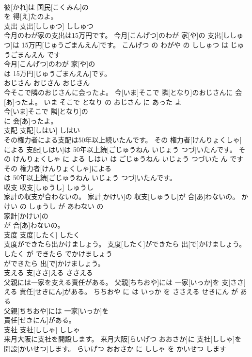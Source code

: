 \documentclass[8pt]{extreport}
\begin{document}
\begin{CJK}{UTF8}{min}
\\	彼[かれ]は 国民[こくみん]の
\\	を 得[え]たのよ。			
\\	支出	支出[ししゅつ]	ししゅつ	
\\	今月のわが家の支出は15万円です。	今月[こんげつ]のわが 家[や]の 支出[ししゅつ]は 15万円[じゅうごまんえん]です。	こんげつ の わがや の ししゅつ は じゅうごまんえん です	
\\	今月[こんげつ]のわが 家[や]の
\\	は 15万円[じゅうごまんえん]です。			
\\	おじさん	おじさん	おじさん	
\\	今そこで隣のおじさんに会ったよ。	今[いま]そこで 隣[となり]のおじさんに 会[あ]ったよ。	いま そこで となり の おじさん に あった よ	
\\	今[いま]そこで 隣[となり]の
\\	に 会[あ]ったよ。			
\\	支配	支配[しはい]	しはい	
\\	その権力者による支配は50年以上続いたんです。	その 権力者[けんりょくしゃ]による 支配[しはい]は 50年以上続[ごじゅうねん いじょう つづ]いたんです。	その けんりょくしゃ に よる しはい は ごじゅうねん いじょう つづいた ん です	
\\	その 権力者[けんりょくしゃ]による
\\	は 50年以上続[ごじゅうねん いじょう つづ]いたんです。			
\\	収支	収支[しゅうし]	しゅうし	
\\	家計の収支が合わないの。	家計[かけい]の 収支[しゅうし]が 合[あ]わないの。	かけい の しゅうし が あわない の	
\\	家計[かけい]の
\\	が 合[あ]わないの。			
\\	支度	支度[したく]	したく	
\\	支度ができたら出かけましょう。	支度[したく]ができたら 出[で]かけましょう。	したく が できたら でかけましょう	
\\	ができたら 出[で]かけましょう。			
\\	支える	支[ささ]える	ささえる	
\\	父親には一家を支える責任がある。	父親[ちちおや]には 一家[いっか]を 支[ささ]える 責任[せきにん]がある。	ちちおや に は いっか を ささえる せきにん が ある	
\\	父親[ちちおや]には 一家[いっか]を
\\	責任[せきにん]がある。			
\\	支社	支社[ししゃ]	ししゃ	
\\	来月大阪に支社を開設します。	来月大阪[らいげつ おおさか]に 支社[ししゃ]を 開設[かいせつ]します。	らいげつ おおさか に ししゃ を かいせつ します	

\end{CJK}
\end{document}
